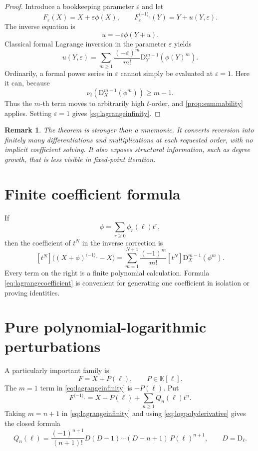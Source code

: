 \documentclass[11pt,oneside,openany]{book}
\newtheorem{remark}[theorem]{Remark}
\newcommand{\K}{\mathbb{K}}
\newcommand{\ordt}{\nu_t}
\newcommand{\rev}{^{\langle-1\rangle_{\circ}}}
\newcommand{\D}{\mathrm{D}}
\newcommand{\eps}{\varepsilon}
\begin{document}
\begin{proof}
Introduce a bookkeeping parameter \(\eps\) and let
\[
 F_\eps(X)=X+\eps\phi(X),
 \qquad
 F_\eps\rev(Y)=Y+u(Y,\eps).
\]
The inverse equation is
\begin{equation}\label{eq:lagrangeparameter}
 u=-\eps\phi(Y+u).
\end{equation}
Classical formal Lagrange inversion in the parameter \(\eps\) yields
\begin{equation}\label{eq:lagrangeepsilon}
 u(Y,\eps)
 =\sum_{m\geq1}\frac{(-\eps)^m}{m!}
   \D_Y^{m-1}\!\left(\phi(Y)^m\right).
\end{equation}
Ordinarily, a formal power series in \(\eps\) cannot simply be evaluated at
\(\eps=1\).  Here it can, because
\[
 \ordt\!\left(
 \D_X^{m-1}(\phi^m)
 \right)\geq m-1.
\]
Thus the \(m\)-th term moves to arbitrarily high \(t\)-order, and
\cref{prop:summability} applies.  Setting \(\eps=1\) gives
\cref{eq:lagrangeinfinity}.
\end{proof}

\begin{remark}
The theorem is stronger than a mnemonic.  It converts reversion into finitely
many differentiations and multiplications at each requested order, with no
implicit coefficient solving.  It also exposes structural information, such
as degree growth, that is less visible in fixed-point iteration.
\end{remark}

\section{Finite coefficient formula}
If
\[
 \phi=\sum_{r\geq0}\phi_r(\ell)t^r,
\]
then the coefficient of \(t^N\) in the inverse correction is
\begin{equation}\label{eq:lagrangecoefficient}
 [t^N]\bigl((X+\phi)\rev-X\bigr)
 =\sum_{m=1}^{N+1}
   \frac{(-1)^m}{m!}
   [t^N]\D_X^{m-1}(\phi^m).
\end{equation}
Every term on the right is a finite polynomial calculation.  Formula
\cref{eq:lagrangecoefficient} is convenient for generating one coefficient in
isolation or proving identities.

\section{Pure polynomial-logarithmic perturbations}
A particularly important family is
\begin{equation}\label{eq:XP}
 F=X+P(\ell),
 \qquad P\in\K[\ell].
\end{equation}
The \(m=1\) term in \cref{eq:lagrangeinfinity} is \(-P(\ell)\).  Put
\begin{equation}\label{eq:Pinverseform}
 F\rev
 =X-P(\ell)+\sum_{n\geq1}Q_n(\ell)t^n.
\end{equation}
Taking \(m=n+1\) in \cref{eq:lagrangeinfinity} and using
\cref{eq:logpolyderivative} gives the closed formula
\begin{equation}\label{eq:QnP}
 Q_n(\ell)
 =\frac{(-1)^{n+1}}{(n+1)!}
 D(D-1)\cdots(D-n+1)\,P(\ell)^{n+1},
 \qquad D=\D_\ell.
\end{equation}
\end{document}

